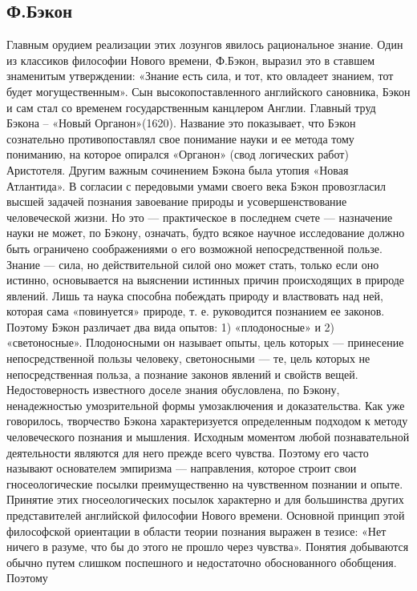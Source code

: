 \documentclass[12pt]{article}
\begin{document}
\subsection {Ф.Бэкон}
Главным
орудием реализации этих лозунгов явилось рациональное знание. Один из классиков философии Нового
времени, Ф.Бэкон, выразил это в ставшем знаменитым утверждении: «Знание есть сила, и тот, кто
овладеет знанием, тот будет могущественным».
Сын высокопоставленного английского сановника, Бэкон и сам стал со временем государственным канцлером
Англии. Главный труд Бэкона – «Новый Органон»(1620). Название это показывает, что Бэкон сознательно
противопоставлял свое понимание науки и ее метода тому пониманию, на которое опирался «Органон» (свод
логических работ) Аристотеля. Другим важным сочинением Бэкона была утопия «Новая Атлантида».
В согласии с передовыми умами своего века Бэкон провозгласил высшей задачей познания завоевание природы
и усовершенствование человеческой жизни. Но это — практическое в последнем счете — назначение науки не
может, по Бэкону, означать, будто всякое научное исследование должно быть ограничено соображениями о его
возможной непосредственной пользе. Знание — сила, но действительной силой оно может стать, только если
оно истинно, основывается на выяснении истинных причин происходящих в природе явлений. Лишь та наука
способна побеждать природу и властвовать над ней, которая сама «повинуется» природе, т. е. руководится
познанием ее законов.
Поэтому Бэкон различает два вида опытов: 1) «плодоносные» и 2) «светоносные». Плодоносными он называет
опыты, цель которых — принесение непосредственной пользы человеку, светоносными — те, цель которых
не непосредственная польза, а познание законов явлений и свойств вещей. Недостоверность известного
доселе знания обусловлена, по Бэкону, ненадежностью умозрительной формы умозаключения и доказательства.
Как уже говорилось, творчество Бэкона характеризуется определенным подходом к методу человеческого
познания и мышления. Исходным моментом любой познавательной деятельности являются для него прежде
всего чувства. Поэтому его часто называют основателем эмпиризма — направления, которое строит свои
гносеологические посылки преимущественно на чувственном познании и опыте. Принятие этих
гносеологических посылок характерно и для большинства других представителей английской философии
Нового времени. Основной принцип этой философской ориентации в области теории познания выражен в тезисе:
«Нет ничего в разуме, что бы до этого не прошло через чувства».
Понятия добываются обычно путем слишком поспешного и недостаточно обоснованного обобщения. Поэтому
\end{document}
